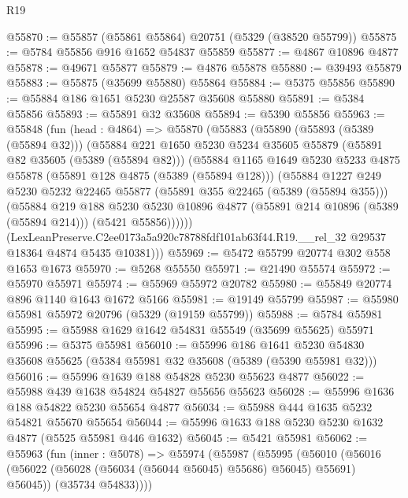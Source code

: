 \begin{lexlean}{R19}
\begin{coremodule}
@55870 := @55857 (@55861 @55864) @20751 (@5329 (@38520 @55799))
@55875 := @5784 @55856 @916 @1652 @54837 @55859
@55877 := @4867 @10896 @4877
@55878 := @49671 @55877
@55879 := @4876 @55878
@55880 := @39493 @55879
@55883 := @55875 (@35699 @55880) @55864
@55884 := @5375 @55856
@55890 := @55884 @186 @1651 @5230 @25587 @35608 @55880
@55891 := @5384 @55856
@55893 := @55891 @32 @35608
@55894 := @5390 @55856
@55963 := @55848
    (fun (head : @4864) =>
    @55870
      (@55883
        (@55890
          (@55893 (@5389 (@55894 @32)))
          (@55884
            @221
            @1650
            @5230
            @5234
            @35605
            @55879
            (@55891 @82 @35605 (@5389 (@55894 @82)))
            (@55884
              @1165
              @1649
              @5230
              @5233
              @4875
              @55878
              (@55891 @128 @4875 (@5389 (@55894 @128)))
              (@55884
                @1227
                @249
                @5230
                @5232
                @22465
                @55877
                (@55891 @355 @22465 (@5389 (@55894 @355)))
                (@55884
                  @219
                  @188
                  @5230
                  @5230
                  @10896
                  @4877
                  (@55891 @214 @10896 (@5389 (@55894 @214)))
                  (@5421 @55856))))))
        (LexLeanPreserve.C2ee0173a5a920c78788fdf101ab63f44.R19.__rel_32
          @29537
          @18364
          @4874
          @5435
          @10381)))
@55969 := @5472 @55799 @20774 @302 @558 @1653 @1673
@55970 := @5268 @55550
@55971 := @21490 @55574
@55972 := @55970 @55971
@55974 := @55969 @55972 @20782
@55980 := @55849 @20774 @896 @1140 @1643 @1672 @5166
@55981 := @19149 @55799
@55987 := @55980 @55981 @55972 @20796 (@5329 (@19159 @55799))
@55988 := @5784 @55981
@55995 := @55988 @1629 @1642 @54831 @55549 (@35699 @55625) @55971
@55996 := @5375 @55981
@56010 := @55996
    @186
    @1641
    @5230
    @54830
    @35608
    @55625
    (@5384 @55981 @32 @35608 (@5389 (@5390 @55981 @32)))
@56016 := @55996 @1639 @188 @54828 @5230 @55623 @4877
@56022 := @55988 @439 @1638 @54824 @54827 @55656 @55623
@56028 := @55996 @1636 @188 @54822 @5230 @55654 @4877
@56034 := @55988 @444 @1635 @5232 @54821 @55670 @55654
@56044 := @55996 @1633 @188 @5230 @5230 @1632 @4877 (@5525 @55981 @446 @1632)
@56045 := @5421 @55981
@56062 := @55963
    (fun (inner : @5078) =>
    @55974
      (@55987
        (@55995
          (@56010 (@56016 (@56022 (@56028 (@56034 (@56044 @56045) @55686) @56045) @55691) @56045))
          (@35734 @54833))))

\end{coremodule}
\end{lexlean}
